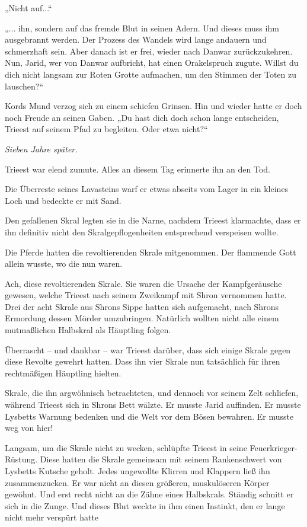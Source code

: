 „Nicht auf...“

„... ihn, sondern auf das fremde Blut in seinen Adern. Und dieses muss ihm ausgebrannt werden. Der Prozess des Wandels wird lange andauern und schmerzhaft sein. Aber danach ist er frei, wieder nach Danwar zurückzukehren. Nun, Jarid, wer von Danwar aufbricht, hat einen Orakelspruch zugute. Willst du dich nicht langsam zur Roten Grotte aufmachen, um den Stimmen der Toten zu lauschen?“

Kords Mund verzog sich zu einem schiefen Grinsen. Hin und wieder hatte er doch noch Freude an seinen Gaben. „Du hast dich doch schon lange entscheiden, Trieest auf seinem Pfad zu begleiten. Oder etwa nicht?“








\textit{Sieben Jahre später.}\bigskip



Trieest war elend zumute. Alles an diesem Tag erinnerte ihn an den Tod.

Die Überreste seines Lavasteins warf er etwas abseits vom Lager in ein kleines Loch und bedeckte er mit Sand.

Den gefallenen Skral legten sie in die Narne, nachdem Trieest klarmachte, dass er ihn definitiv nicht den Skralgepflogenheiten entsprechend verspeisen wollte.

Die Pferde hatten die revoltierenden Skrale mitgenommen. Der flammende Gott allein wusste, wo die nun waren.

Ach, diese revoltierenden Skrale. Sie waren die Ursache der Kampfgeräusche gewesen, welche Trieest nach seinem Zweikampf mit Shron vernommen hatte. Drei der acht Skrale aus Shrons Sippe hatten sich aufgemacht, nach Shrons Ermordung dessen Mörder umzubringen. Natürlich wollten nicht alle einem mutmaßlichen Halbskral als Häuptling folgen.

Überrascht – und dankbar – war Trieest darüber, dass sich einige Skrale gegen diese Revolte gewehrt hatten. Dass ihn vier Skrale nun tatsächlich für ihren rechtmäßigen Häuptling hielten.

Skrale, die ihn argwöhnisch betrachteten, und dennoch vor seinem Zelt schliefen, während Trieest sich in Shrons Bett wälzte. Er musste Jarid auffinden. Er musste Lysbetts Warnung bedenken und die Welt vor dem Bösen bewahren. Er musste weg von hier!

Langsam, um die Skrale nicht zu wecken, schlüpfte Trieest in seine Feuerkrieger-Rüstung. Diese hatten die Skrale gemeinsam mit seinem Rankenschwert von Lysbetts Kutsche geholt. Jedes ungewollte Klirren und Klappern ließ ihn zusammenzucken. Er war nicht an diesen größeren, muskulöseren Körper gewöhnt. Und erst recht nicht an die Zähne eines Halbskrals. Ständig schnitt er sich in die Zunge. Und dieses Blut weckte in ihm einen Instinkt, den er lange nicht mehr verspürt hatte

